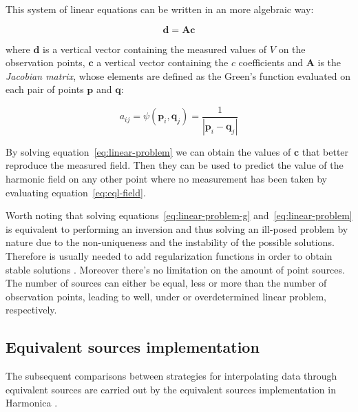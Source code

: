 \documentclass[twocolumn]{article}
\begin{document}
This system of linear equations can be written in an more algebraic way:

\begin{equation}
    \mathbf{d} = \mathbf{A} \mathbf{c}
    \label{eq:linear-problem}
\end{equation}

\noindent where $\mathbf{d}$ is a vertical vector containing the measured
values of $V$ on the observation points, $\mathbf{c}$ a vertical vector
containing the $c$ coefficients and $\mathbf{A}$ is the \emph{Jacobian matrix},
whose elements are defined as the Green's function evaluated on each pair of
points $\mathbf{p}$ and $\mathbf{q}$:

\begin{equation}
    a_{ij}
    =
    \psi(\mathbf{p}_i, \mathbf{q}_j)
    =
    \frac{1}{|\mathbf{p}_i - \mathbf{q}_j|}
\end{equation}

By solving equation~\ref{eq:linear-problem} we can obtain the values of
$\mathbf{c}$ that better reproduce the measured field.
Then they can be used to predict the value of the harmonic field on any other
point where no measurement has been taken by evaluating
equation~\ref{eq:eql-field}.

Worth noting that solving equations~\ref{eq:linear-problem-g}
and~\ref{eq:linear-problem} is equivalent to performing an inversion and thus
solving an ill-posed problem by nature due to the non-uniqueness and the
instability of the possible solutions.
Therefore is usually needed to add regularization functions in order to obtain
stable solutions \citep{oliveira2013}.
Moreover there's no limitation on the amount of point sources.
The number of sources can either be equal, less or more than the number of
observation points, leading to well, under or overdetermined linear problem,
respectively.



\subsection{Equivalent sources implementation}

The subsequent comparisons between strategies for interpolating data through
equivalent sources are carried out by the equivalent sources implementation in
Harmonica \citep{harmonica}.
\end{document}
